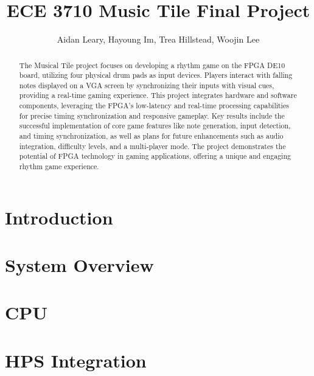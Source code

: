 \documentclass[10pt, letterpaper]{IEEEconf}
\begin{document}
\title{ECE 3710 Music Tile Final Project\\
}

  \author{
  {Aidan Leary, Hayoung Im, Trea Hillstead, Woojin Lee}
  }


  \maketitle

  \begin{abstract}
The Musical Tile project focuses on developing a rhythm game on the FPGA DE10 board, utilizing four physical drum pads as input devices. Players interact with falling notes displayed on a VGA screen by synchronizing their inputs with visual cues, providing a real-time gaming experience. This project integrates hardware and software components, leveraging the FPGA's low-latency and real-time processing capabilities for precise timing synchronization and responsive gameplay. Key results include the successful implementation of core game features like note generation, input detection, and timing synchronization, as well as plans for future enhancements such as audio integration, difficulty levels, and a multi-player mode. The project demonstrates the potential of FPGA technology in gaming applications, offering a unique and engaging rhythm game experience.
  \end{abstract}


  \section{Introduction} 
  

  \section{System Overview}
  

  \section{CPU}
  

  \section{HPS Integration}
  
\end{document}
